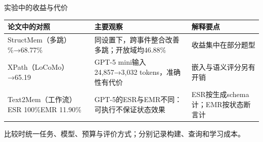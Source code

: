 \begin{frame}{实验中的收益与代价}
    \small
    \begin{tabularx}{\linewidth}{@{}>{\raggedright\arraybackslash}p{34mm}YY@{}}
        \toprule
        论文中的对照 & 主要观察 & 解释要点 \\
        \midrule
        StructMem（多跳）\%→68.77\% & 同设置下，跨事件整合改善多跳；开放域均46.88\% & 收益集中在部分题型\\[2mm]
        XPath（LoCoMo）→65.19 & GPT-5 mini输入24,857→3,032 tokens，准确性有代价 & 嵌入与语义评分另有开销\\[2mm]
        Text2Mem（工作流）\newline ESR 100\%\newline EMR 11.90\% & GPT-5的ESR与EMR不同：可执行不保证状态效果 & ESR按生成schema计；EMR按状态断言计\\
        \bottomrule
    \end{tabularx}
    \par\vspace{3mm}比较时统一任务、模型、预算与评价方式；分别记录构建、查询和学习成本。\par
\end{frame}

